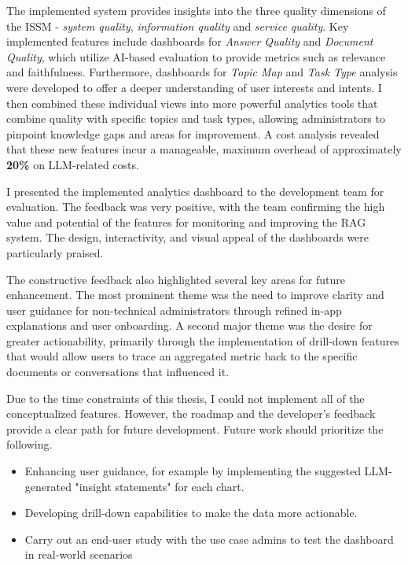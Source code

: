 \documentclass[
	english,
	ruledheaders=section,%
	class=report,%
	thesis={type=bachelor},%
	accentcolor=1b,%
	custommargins=true,%
	marginpar=false,%
	parskip=half-,%
	fontsize=11pt,%
	DIV=14,
]{tudapub}
\begin{document}
The implemented system provides insights into the three quality dimensions of the ISSM \parencite{DeloneMcLean2003ISSuccessTenYearUpdate} - \textit{system quality}, \textit{information quality} and \textit{service quality}. Key implemented features include dashboards for \textit{Answer Quality} and \textit{Document Quality}, which utilize AI-based evaluation to provide metrics such as relevance and faithfulness. Furthermore, dashboards for \textit{Topic Map} and \textit{Task Type} analysis were developed to offer a deeper understanding of user interests and intents. I then combined these individual views into more powerful analytics tools that combine quality with specific topics and task types, allowing administrators to pinpoint knowledge gaps and areas for improvement. A cost analysis revealed that these new features incur a manageable, maximum overhead of approximately \textbf{20\%} on LLM-related costs.

I presented the implemented analytics dashboard to the development team for evaluation. The feedback was very positive, with the team confirming the high value and potential of the features for monitoring and improving the RAG system. The design, interactivity, and visual appeal of the dashboards were particularly praised.

The constructive feedback also highlighted several key areas for future enhancement. The most prominent theme was the need to improve clarity and user guidance for non-technical administrators through refined in-app explanations and user onboarding. A second major theme was the desire for greater actionability, primarily through the implementation of drill-down features that would allow users to trace an aggregated metric back to the specific documents or conversations that influenced it.

Due to the time constraints of this thesis, I could not implement all of the conceptualized features. However, the roadmap and the developer's feedback provide a clear path for future development. Future work should prioritize the following.
\begin{itemize}
    \item Enhancing user guidance, for example by implementing the suggested LLM-generated "insight statements" for each chart.
    \item Developing drill-down capabilities to make the data more actionable.
    \item Carry out an end-user study with the use case admins to test the dashboard in real-world scenarios
\end{itemize}
\end{document}
